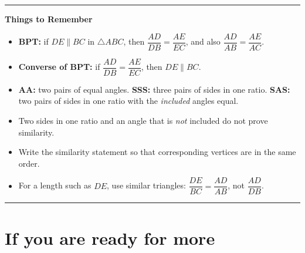 \documentclass[11pt,a4paper]{article}
\theoremstyle{brand}
\theoremstyle{branddef}
\newcommand{\tr}{\triangle}
\newcommand{\rememberbox}[1]{%
  \par\medskip\noindent
  \colorbox{panel}{%
    \parbox{\dimexpr\linewidth-2\fboxsep\relax}{%
      \medskip
      \textbf{\color{accent}\large Things to Remember}
      \par\smallskip #1 \medskip}}
  \par\medskip}
\renewcommand{\colorbox}[2]{\par\smallskip\noindent\textcolor{black!35}{\rule{\linewidth}{0.4pt}}\par\nointerlineskip\vspace{3pt}\noindent#2\par\vspace{2pt}\noindent\textcolor{black!35}{\rule{\linewidth}{0.4pt}}\par\smallskip}
\begin{document}
\rememberbox{%
\begin{itemize}[leftmargin=1.6em,itemsep=2pt,topsep=2pt]
  \item \textbf{BPT:} if $DE\parallel BC$ in $\tr ABC$, then $\dfrac{AD}{DB}=\dfrac{AE}{EC}$, and also $\dfrac{AD}{AB}=\dfrac{AE}{AC}$.
  \item \textbf{Converse of BPT:} if $\dfrac{AD}{DB}=\dfrac{AE}{EC}$, then $DE\parallel BC$.
  \item \textbf{AA:} two pairs of equal angles. \textbf{SSS:} three pairs of sides in one ratio. \textbf{SAS:} two pairs of sides in one ratio with the \emph{included} angles equal.
  \item Two sides in one ratio and an angle that is \emph{not} included do not prove similarity.
  \item Write the similarity statement so that corresponding vertices are in the same order.
  \item For a length such as $DE$, use similar triangles: $\dfrac{DE}{BC}=\dfrac{AD}{AB}$, not $\dfrac{AD}{DB}$.
\end{itemize}}

\section{If you are ready for more}
\end{document}
